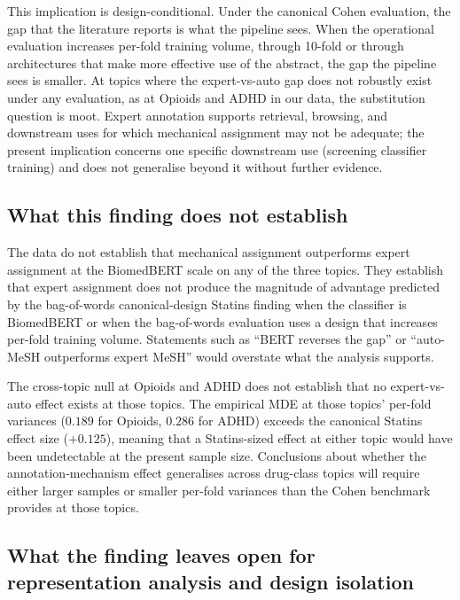 \documentclass{article}
\begin{document}
This implication is design-conditional. Under the canonical Cohen evaluation, the gap that the literature reports is what the pipeline sees. When the operational evaluation increases per-fold training volume, through 10-fold or through architectures that make more effective use of the abstract, the gap the pipeline sees is smaller. At topics where the expert-vs-auto gap does not robustly exist under any evaluation, as at Opioids and ADHD in our data, the substitution question is moot. Expert annotation supports retrieval, browsing, and downstream uses for which mechanical assignment may not be adequate; the present implication concerns one specific downstream use (screening classifier training) and does not generalise beyond it without further evidence.

\subsection{What this finding does not establish}

The data do not establish that mechanical assignment outperforms expert assignment at the BiomedBERT scale on any of the three topics. They establish that expert assignment does not produce the magnitude of advantage predicted by the bag-of-words canonical-design Statins finding when the classifier is BiomedBERT or when the bag-of-words evaluation uses a design that increases per-fold training volume. Statements such as ``BERT reverses the gap'' or ``auto-MeSH outperforms expert MeSH'' would overstate what the analysis supports.

The cross-topic null at Opioids and ADHD does not establish that no expert-vs-auto effect exists at those topics. The empirical MDE at those topics' per-fold variances ($0.189$ for Opioids, $0.286$ for ADHD) exceeds the canonical Statins effect size ($+0.125$), meaning that a Statins-sized effect at either topic would have been undetectable at the present sample size. Conclusions about whether the annotation-mechanism effect generalises across drug-class topics will require either larger samples or smaller per-fold variances than the Cohen benchmark provides at those topics.

\subsection{What the finding leaves open for representation analysis and design isolation}
\end{document}
